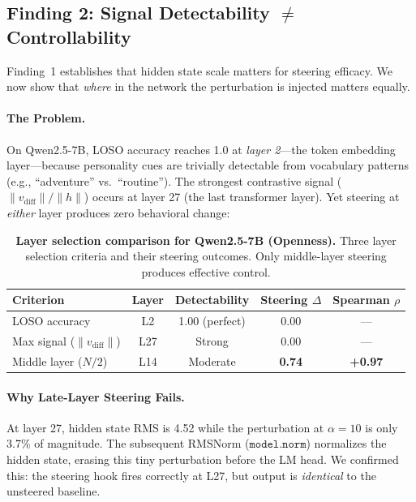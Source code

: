 \documentclass{article}
\begin{document}
\subsection{Finding 2: Signal Detectability $\neq$ Controllability}\label{sec:layer_finding}

Finding~1 establishes that hidden state scale matters for steering efficacy. We now show that \emph{where} in the network the perturbation is injected matters equally.

\paragraph{The Problem.} On Qwen2.5-7B, LOSO accuracy reaches 1.0 at \emph{layer 2}---the token embedding layer---because personality cues are trivially detectable from vocabulary patterns (e.g., ``adventure'' vs.\ ``routine''). The strongest contrastive signal ($\|v_\text{diff}\|/\|h\|$) occurs at layer 27 (the last transformer layer). Yet steering at \emph{either} layer produces zero behavioral change:

\begin{table}[t]
\caption{\textbf{Layer selection comparison for Qwen2.5-7B (Openness).} Three layer selection criteria and their steering outcomes. Only middle-layer steering produces effective control.}
\label{tab:layer_comparison}
\centering
\small
\begin{tabular}{lcccc}
\toprule
\textbf{Criterion} & \textbf{Layer} & \textbf{Detectability} & \textbf{Steering $\Delta$} & \textbf{Spearman $\rho$} \\
\midrule
LOSO accuracy & L2 & 1.00 (perfect) & 0.00 & --- \\
Max signal ($\|v_\text{diff}\|$) & L27 & Strong & 0.00 & --- \\
Middle layer ($N/2$) & L14 & Moderate & \textbf{0.74} & \textbf{+0.97} \\
\bottomrule
\end{tabular}
\end{table}

\paragraph{Why Late-Layer Steering Fails.} At layer 27, hidden state RMS is 4.52 while the perturbation at $\alpha{=}10$ is only 3.7\% of magnitude. The subsequent RMSNorm ($\texttt{model.norm}$) normalizes the hidden state, erasing this tiny perturbation before the LM head. We confirmed this: the steering hook fires correctly at L27, but output is \emph{identical} to the unsteered baseline.
\end{document}
